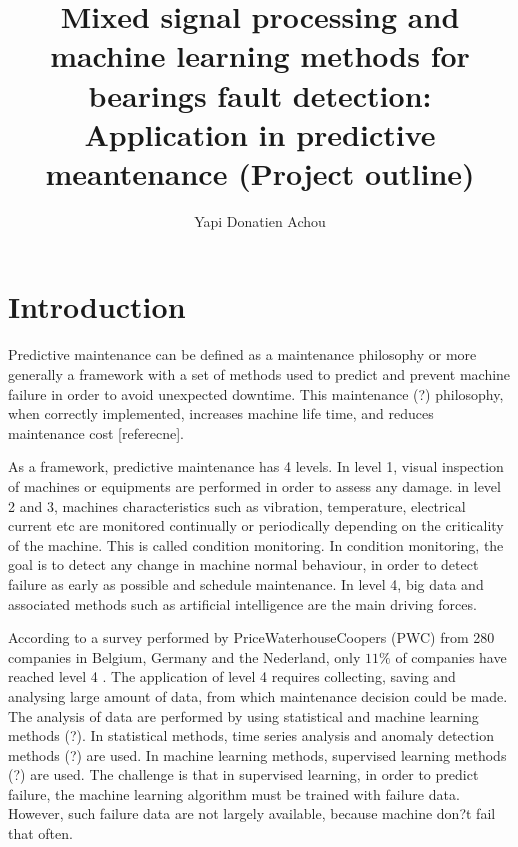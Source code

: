 \documentclass[11pt, oneside]{article}   	%
\title{Mixed signal processing and machine learning methods for bearings fault detection: Application in predictive meantenance (Project outline)}
\author{Yapi Donatien Achou}
\begin{document}
\maketitle
\tableofcontents
\newpage
\section{Introduction}
\begin{flushleft}
Predictive maintenance can be defined as a maintenance philosophy or more generally a framework with a set of methods used to predict and prevent machine failure in order to avoid unexpected downtime. This maintenance (?) philosophy, when correctly implemented, increases machine life time, and reduces maintenance cost [referecne].
\end{flushleft}

\begin{flushleft}
As a framework, predictive maintenance has 4 levels. In level 1, visual inspection of machines or equipments are performed in order to assess any damage. in level 2 and 3, machines characteristics such as vibration, temperature, electrical current etc are monitored continually or periodically depending on the criticality of the machine. This is called condition monitoring. In condition monitoring, the goal is to detect any change in machine normal behaviour, in order to detect failure as early as possible and schedule maintenance. In level 4, big data and associated methods such as artificial intelligence are the main driving forces. 
\end{flushleft}

\begin{flushleft}
According to a survey performed by PriceWaterhouseCoopers (PWC) from 280 companies in Belgium, Germany and the Nederland, only 
$11 \%$ of companies have reached level 4 \cite{pwc}. The application of level 4 requires collecting, saving and analysing large amount of data, from which maintenance decision could be made.
The analysis of data are performed by using statistical and machine learning methods (?). In statistical methods, time series analysis and anomaly detection methods (?) are used. In machine learning methods, supervised learning methods (?) are used. The challenge is that in supervised learning, in order to predict failure, the machine learning algorithm must be trained with failure data. However, 
such failure data are not largely available, because machine don?t fail that often.

\end{flushleft}
\end{document}
